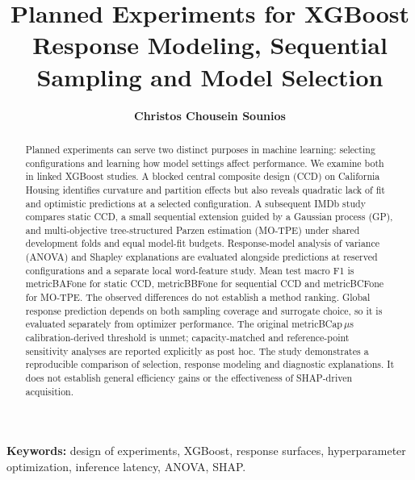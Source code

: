\documentclass[12pt,a4paper]{article}
\title{\textbf{Planned Experiments for XGBoost}\\[0.35em]\large Response Modeling, Sequential Sampling and Model Selection}
\author{\textbf{Christos Chousein Sounios}}
\date{}
\newcommand{\m}[1]{\csname metric#1\endcsname}
\begin{document}
\maketitle
\begin{abstract}
Planned experiments can serve two distinct purposes in machine learning: selecting configurations and learning how model settings affect performance. We examine both in linked XGBoost studies. A blocked central composite design (CCD) on California Housing identifies curvature and partition effects but also reveals quadratic lack of fit and optimistic predictions at a selected configuration. A subsequent IMDb study compares static CCD, a small sequential extension guided by a Gaussian process (GP), and multi-objective tree-structured Parzen estimation (MO-TPE) under shared development folds and equal model-fit budgets. Response-model analysis of variance (ANOVA) and Shapley explanations are evaluated alongside predictions at reserved configurations and a separate local word-feature study.
Mean test macro F1 is \m{BAFone} for static CCD, \m{BBFone} for sequential CCD and \m{BCFone} for MO-TPE. The observed differences do not establish a method ranking. Global response prediction depends on both sampling coverage and surrogate choice, so it is evaluated separately from optimizer performance. The original \m{BCap}\,$\mu$s calibration-derived threshold is unmet; capacity-matched and reference-point sensitivity analyses are reported explicitly as post hoc. The study demonstrates a reproducible comparison of selection, response modeling and diagnostic explanations. It does not establish general efficiency gains or the effectiveness of SHAP-driven acquisition.
\end{abstract}
\noindent\textbf{Keywords:} design of experiments, XGBoost, response surfaces, hyperparameter optimization, inference latency, ANOVA, SHAP.
\clearpage
\setcounter{tocdepth}{2}
\begingroup\small\setlength{\parskip}{0pt}\tableofcontents\endgroup
\clearpage
\end{document}
